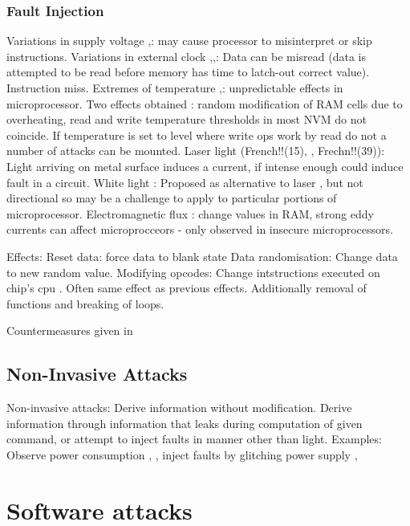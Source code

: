 \subsubsection{Fault Injection}
Variations in supply voltage \cite{Anderson1996},\cite{Blomer2010}: may cause processor to misinterpret or skip instructions.
Variations in external clock \cite{Anderson1996},\cite{Street},\cite{Kommerling1999}: Data can be misread (data is attempted to be read before memory has time to latch-out correct value). Instruction miss.
Extremes of temperature \cite{Boneh},\cite{Govindavajhala2003}: unpredictable effects in microprocessor. Two effects obtained \cite{Bar-el2006}: random modification of RAM cells due to overheating, read and write temperature thresholds in most NVM do not coincide. If temperature is set to level where write ops work by read do not a number of attacks can be mounted.
Laser light (French!!(15), \cite{Habing1965}, Frechn!!(39)): Light arriving on metal surface induces a current, if intense enough could induce fault in a circuit.
White light \cite{Anderson1996}: Proposed as alternative to laser \cite{Skorobogatov2007}, but not directional so may be a challenge to apply to particular portions of microprocessor.
Electromagnetic flux \cite{Samyde2003}: change values in RAM, strong eddy currents can affect microprocceors - only observed in insecure microprocessors.

Effects:
Reset data: force data to blank state
Data randomisation: Change data to new random value.
Modifying opcodes: Change intstructions executed on chip's cpu \cite{Anderson1996}. Often same effect as previous effects. Additionally removal of functions and breaking of loops. 

Countermeasures given in \cite{Bar-el2006}
  
\subsection{Non-Invasive Attacks}
Non-invasive attacks: Derive information without modification.
Derive information through information that leaks during computation of given command, or attempt to inject faults in manner other than light.
Examples: Observe power consumption \cite{Maurer1999}, \cite{MangardStefan2007Paa:}, inject faults by glitching power supply \cite{Anderson1996}, \cite{Bar-el2006}

\section{Software attacks}
